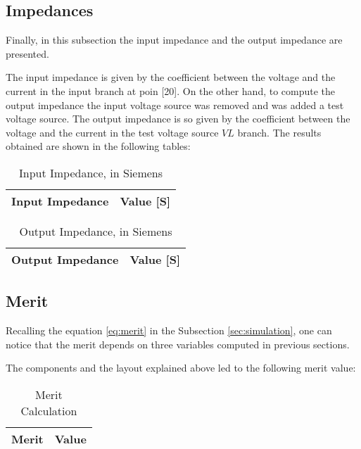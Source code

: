 \subsection{Impedances}
\label{impedances}
\par Finally, in this subsection the input impedance and the output impedance are presented.
\par The input impedance is given by the coefficient between the voltage and the current in the input branch at poin [20]. On the other hand, to compute the output impedance the input voltage source was removed and was added a test voltage source. The output impedance is so given by the coefficient between the voltage and the current in the test voltage source $VL$ branch. The results obtained are shown in the following tables:

\begin{table}[H]
  \centering
  \begin{tabular}{|l|r|}
    \hline    
    {\bf Input Impedance} & {\bf Value [S]} \\ \hline
    
  \end{tabular}
  \caption{Input Impedance, in Siemens}
  \label{tab:input_z}
\end{table}


\begin{table}[H]
  \centering
  \begin{tabular}{|l|r|}
    \hline    
    {\bf Output Impedance} & {\bf Value [S]} \\ \hline
    
  \end{tabular}
  \caption{Output Impedance, in Siemens}
  \label{tab:output_z}
\end{table}





\subsection{Merit}
\label{merit}

\par Recalling the equation \ref{eq:merit} in the Subsection \ref{sec:simulation}, one can notice that the merit depends on three variables computed in previous sections.
\par The components and the layout explained above led to the following merit value:

\begin{table}[H]
  \centering
  \begin{tabular}{ |l|r| } 
    \hline    
    {\bf Merit} & {\bf Value} \\ \hline
    
  \end{tabular}
  \caption{Merit Calculation}
  \label{tab:merit}
\end{table}

